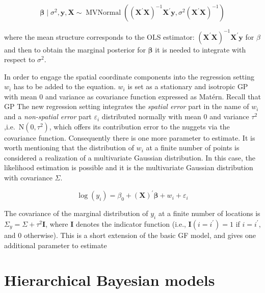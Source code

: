 \documentclass[
  12pt,
  a4paper,
  oneside]{book}
\theoremstyle{definition}
\theoremstyle{definition}
\theoremstyle{definition}
\theoremstyle{remark}
\begin{document}
\[
\boldsymbol{\beta} \mid \sigma^{2}, \boldsymbol{y}, \boldsymbol{X} \sim \operatorname{MVNormal}\left(\left(\boldsymbol{X}^{\prime} \boldsymbol{X}\right)^{-1} \boldsymbol{X}^{\prime} \boldsymbol{y}, \sigma^{2}\left(\boldsymbol{X}^{\prime} \boldsymbol{X}\right)^{-1}\right)
\]

where the mean structure corresponds to the OLS estimator: \(\left(\boldsymbol{X}^{\prime} \boldsymbol{X}\right)^{-1} \boldsymbol{X}^{\prime} \boldsymbol{y}\) for \(\beta\) and then to obtain the marginal posterior for \(\boldsymbol{\beta}\) it is needed to integrate with respect to \(\sigma^2\).

In order to engage the spatial coordinate components into the regression setting \(w_{i}\) has to be added to the equation. \(w_{i}\) is set as a stationary and isotropic GP with mean 0 and variance as covariance function expressed as Matérn.
Recall that GP
The new regression setting integrates the \emph{spatial error} part in the name of \(w_{i}\) and a \emph{non-spatial error} part \(\varepsilon_{i}\) distributed normally with mean 0 and variance \(\tau^2\) ,i.e.~\(\mathrm{N}\left(0, \tau^{2}\right)\), which offers its contribution error to the nuggets via the covariance function.
Consequently there is one more parameter to estimate. It is worth mentioning that the distribution of \(w_{i}\) at a finite number of points is considered a realization of a multivariate Gaussian distribution. In this case, the likelihood estimation is possible and it is the multivariate Gaussian distribution with covariance \(\Sigma\).

\[
\log(y_{i})= \beta_{0} + (\mathbf{X})^{\prime}\boldsymbol{\beta}+w_{i}+\varepsilon_{i}
\]

The covariance of the marginal distribution of \(y_{i}\) at a finite number of locations is \(\Sigma_{y} = \Sigma + \tau^2\mathbf{I}\), where \(\mathbf{I}\) denotes the indicator function (i.e., \(\mathbf{I}(i = i^{\prime})= 1\) if \(i = i^{\prime}\), and 0 otherwise). This is a short extension of the basic GF model, and gives one additional parameter to estimate

\hypertarget{hiermod}{%
\section{Hierarchical Bayesian models}\label{hiermod}}
\end{document}
